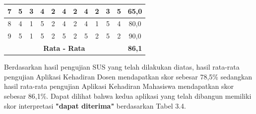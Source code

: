 \begin{enumerate}[a.]
\begin{table}[H]
\begin{tabular}{|c|c|c|c|c|c|c|c|c|c|c|c|}
		7                                           & 5                                              & 3                                  & 4           & 2           & 4           & 2           & 4           & 2           & 3           & 5                                 & 65,0  \\ \hline
		8                                           & 4                                              & 1                                  & 5           & 2           & 4           & 2           & 4           & 1           & 5           & 4                                 & 80,0  \\ \hline
		9                                           & 5                                              & 1                                  & 5           & 2           & 5           & 2           & 5           & 2           & 5           & 2                                 & 90,0  \\ \hline
		\multicolumn{11}{|c|}{\textbf{Rata - Rata}} & \textbf{86,1}                                                                                                                                                                                                                     \\ \hline
	\end{tabular}
\end{table}

\par Berdasarkan hasil pengujian SUS yang telah dilakukan diatas, hasil rata-rata pengujian Aplikasi Kehadiran Dosen mendapatkan skor sebesar 78,5\% sedangkan hasil rata-rata pengujian Aplikasi Kehadiran Mahasiswa mendapatkan skor sebesar 86,1\%. Dapat dilihat bahwa kedua aplikasi yang telah dibangun memiliki skor interpretasi \textbf{"dapat diterima"} berdasarkan Tabel 3.4.


\end{enumerate}

